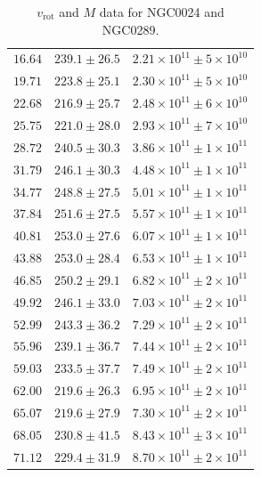 \documentclass{article}
\newcommand\vrot{\ensuremath{v_{\textrm{rot}}}}
\begin{document}
\begin{table}[h!]
\begin{tabular}{|c|c|c|}
        $16.64$ & $239.1 \pm 26.5$ & $2.21\times 10^{11} \pm 5\times 10^{10}$ \\
        $19.71$ & $223.8 \pm 25.1$ & $2.30\times 10^{11} \pm 5\times 10^{10}$ \\
        $22.68$ & $216.9 \pm 25.7$ & $2.48\times 10^{11} \pm 6\times 10^{10}$ \\
        $25.75$ & $221.0 \pm 28.0$ & $2.93\times 10^{11} \pm 7\times 10^{10}$ \\
        $28.72$ & $240.5 \pm 30.3$ & $3.86\times 10^{11} \pm 1\times 10^{11}$ \\
        $31.79$ & $246.1 \pm 30.3$ & $4.48\times 10^{11} \pm 1\times 10^{11}$ \\
        $34.77$ & $248.8 \pm 27.5$ & $5.01\times 10^{11} \pm 1\times 10^{11}$ \\
        $37.84$ & $251.6 \pm 27.5$ & $5.57\times 10^{11} \pm 1\times 10^{11}$ \\
        $40.81$ & $253.0 \pm 27.6$ & $6.07\times 10^{11} \pm 1\times 10^{11}$ \\
        $43.88$ & $253.0 \pm 28.4$ & $6.53\times 10^{11} \pm 1\times 10^{11}$ \\
        $46.85$ & $250.2 \pm 29.1$ & $6.82\times 10^{11} \pm 2\times 10^{11}$ \\
        $49.92$ & $246.1 \pm 33.0$ & $7.03\times 10^{11} \pm 2\times 10^{11}$ \\
        $52.99$ & $243.3 \pm 36.2$ & $7.29\times 10^{11} \pm 2\times 10^{11}$ \\
        $55.96$ & $239.1 \pm 36.7$ & $7.44\times 10^{11} \pm 2\times 10^{11}$ \\
        $59.03$ & $233.5 \pm 37.7$ & $7.49\times 10^{11} \pm 2\times 10^{11}$ \\
        $62.00$ & $219.6 \pm 26.3$ & $6.95\times 10^{11} \pm 2\times 10^{11}$ \\
        $65.07$ & $219.6 \pm 27.9$ & $7.30\times 10^{11} \pm 2\times 10^{11}$ \\
        $68.05$ & $230.8 \pm 41.5$ & $8.43\times 10^{11} \pm 3\times 10^{11}$ \\
        $71.12$ & $229.4 \pm 31.9$ & $8.70\times 10^{11} \pm 2\times 10^{11}$ \\
        \hline
    \end{tabular}
    \caption{$\vrot$ and $M$ data for NGC0024 and NGC0289.}
    \label{tab:proc0024-0289}
\end{table}
\doublespacing
\end{document}
